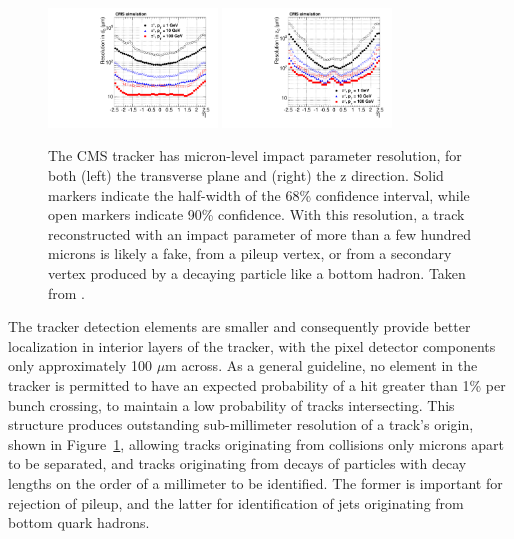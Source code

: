   \begin{figure}[h!]
    \centering
    \includegraphics[width=0.4\textwidth]{figures/pi/resolutionD0VsEta.pdf}
    \includegraphics[width=0.4\textwidth]{figures/pi/resolutionDzVsEta.pdf}
    \caption[Impact parameter resolution in the CMS tracker.]{
      The CMS tracker has micron-level impact parameter resolution, for both (left) the transverse plane and (right) the z direction.
      Solid markers indicate the half-width of the 68\% confidence interval, while open markers indicate 90\% confidence.
      With this resolution, a track reconstructed with an impact parameter of more than a few hundred microns is likely a fake, from a pileup vertex, or from a secondary vertex produced by a decaying particle like a bottom hadron.
      Taken from \cite{cmstracking}.}
    \label{fig:trackresolution}
  \end{figure}  

  The tracker detection elements are smaller and consequently provide better localization in interior layers of the tracker, with the pixel detector components only approximately 100 $\mu$m across.
  As a general guideline, no element in the tracker is permitted to have an expected probability of a hit greater than 1\% per bunch crossing, to maintain a low probability of tracks intersecting.
  This structure produces outstanding sub-millimeter resolution of a track's origin, shown in Figure~\ref{fig:trackresolution}, allowing tracks originating from collisions only microns apart to be separated, and tracks originating from decays of particles with decay lengths on the order of a millimeter to be identified.
  The former is important for rejection of pileup, and the latter for identification of jets originating from bottom quark hadrons.

